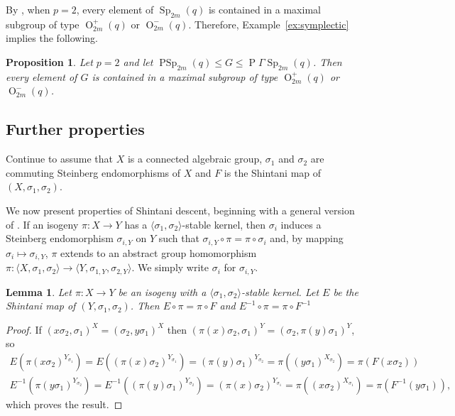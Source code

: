 \documentclass[11pt]{article}
\numberwithin{equation}{section}
\theoremstyle{shdefinition}
\theoremstyle{shplain}
\newtheorem{proposition}[definition]{Proposition}
\newtheorem{lemma}[definition]{Lemma}
\newcommand{\s}{\sigma}
\newcommand{\<}{\langle}
\renewcommand{\>}{\rangle}
\renewcommand{\leq}{\leqslant}
\renewcommand{\:}{\colon}
\newcommand{\Sp}{\operatorname{Sp}}
\newcommand{\PSp}{\operatorname{PSp}}
\newcommand{\PGaSp}{\operatorname{P}\!\Gamma\!\operatorname{Sp}}
\renewcommand{\O}{\operatorname{O}}
\begin{document}
By \cite[Theorem~2]{ref:Dye79}, when $p=2$, every element of $\Sp_{2m}(q)$ is contained in a maximal subgroup of type $\O^+_{2m}(q)$ or $\O^-_{2m}(q)$. Therefore, Example~\ref{ex:symplectic} implies the following.

\begin{proposition} \label{prop:symplectic}
Let $p=2$ and let $\PSp_{2m}(q) \leq G \leq \PGaSp_{2m}(q)$. Then every element of $G$ is contained in a maximal subgroup of type $\O^+_{2m}(q)$ or $\O^-_{2m}(q)$.
\end{proposition}


\subsection{Further properties} \label{ss:shintani_properties}

Continue to assume that $X$ is a connected algebraic group, $\s_1$ and $\s_2$ are commuting Steinberg endomorphisms of $X$ and $F$ is the Shintani map of $(X,\s_1,\s_2)$.

We now present properties of Shintani descent, beginning with a general version of \cite[Lemma~3.2.2]{ref:Harper}. If an isogeny $\pi\:X \to Y$ has a $\<\s_1, \s_2\>$-stable kernel, then $\s_i$ induces a Steinberg endomorphism $\s_{i,Y}$ on $Y$ such that $\s_{i,Y} \circ \pi = \pi \circ \s_i$ and, by mapping $\s_i \mapsto \s_{i,Y}$, $\pi$ extends to an abstract group homomorphism $\pi\: \< X, \s_1, \s_2\> \to \< Y, \s_{1,Y}, \s_{2,Y} \>$. We simply write $\s_i$ for $\s_{i,Y}$.

\begin{lemma} \label{lem:shintani_isogeny}
Let $\pi\:X \to Y$ be an isogeny with a $\<\s_1,\s_2\>$-stable kernel. Let $E$ be the Shintani map of $(Y,\s_1,\s_2)$. Then $E \circ \pi = \pi \circ F$ and $E^{-1} \circ \pi = \pi \circ F^{-1}$
\end{lemma}

\begin{proof}
If $(x\s_2,\s_1)^X = (\s_2,y\s_1)^X$ then $(\pi(x)\s_2,\s_1)^Y = (\s_2,\pi(y)\s_1)^Y$, so
\begin{gather*}
E(\pi(x\s_2)^{Y_{\s_1}}) =  E((\pi(x)\s_2)^{Y_{\s_1}}) = (\pi(y)\s_1)^{Y_{\s_2}} = \pi((y\s_1)^{X_{\s_2}}) = \pi(F(x\s_2)) \\
E^{-1}(\pi(y\s_1)^{Y_{\s_2}}) =  E^{-1}((\pi(y)\s_1)^{Y_{\s_2}}) = (\pi(x)\s_2)^{Y_{\s_1}} = \pi((x\s_2)^{X_{\s_1}}) = \pi(F^{-1}(y\s_1)),
\end{gather*}
which proves the result.
\end{proof}
\end{document}
